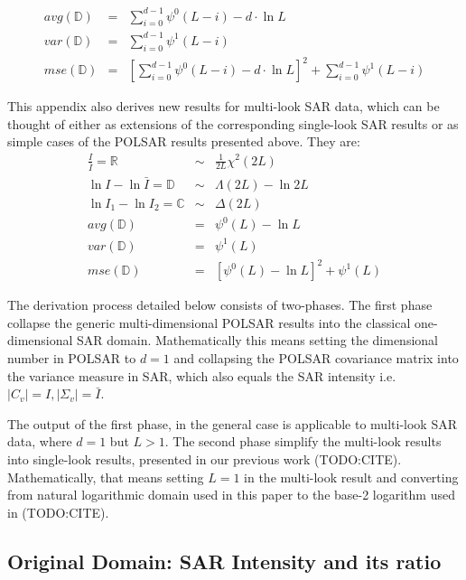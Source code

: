 \documentclass[journal]{IEEEtran}
\begin{document}
\begin{eqnarray}
  avg(\mathbb{D}) &=& \sum^{d-1}_{i=0} \psi^0(L-i) - d \cdot \ln{L} \label{eqn:polsar_dispersion_averages} \\
  var(\mathbb{D}) &=& \sum^{d-1}_{i=0} \psi^1(L-i) \label{eqn:polsar_dispersion_variance} \\
  mse(\mathbb{D}) &=& \left[ \sum^{d-1}_{i=0} \psi^0(L-i) - d \cdot \ln{L} \right]^2 +  \sum^{d-1}_{i=0} \psi^1(L-i) \label{eqn:polsar_dispersion_mse}
\end{eqnarray}

This appendix also derives new results for multi-look SAR data,
  which can be thought of 
    either as extensions of the corresponding single-look SAR results
    or as simple cases of the POLSAR results presented above.
They are:
  \begin{eqnarray}
    \frac{I}{\bar{I}} = \mathbb{R} &\sim& \frac{1}{2L} \chi^2(2L) \\
    \ln{I} - \ln{\bar{I}} = \mathbb{D} &\sim& \Lambda(2L) - \ln{2L} \\
    \ln{I_1} - \ln{I_2} = \mathbb{C} &\sim& \Delta(2L) \\
    avg(\mathbb{D}) &=& \psi^0(L) - \ln{L} \\
    var(\mathbb{D}) &=& \psi^1(L) \\
    mse(\mathbb{D}) &=& \left[ \psi^0(L) - \ln{L} \right]^2 + \psi^1(L)
  \end{eqnarray}

The derivation process detailed below consists of two-phases.
The first phase collapse the generic multi-dimensional POLSAR results into the classical one-dimensional SAR domain.
Mathematically this means setting the dimensional number in POLSAR to  $d=1$
  and collapsing the POLSAR covariance matrix into the variance measure in SAR, which also equals the SAR intensity i.e. $|C_v|=I,|\Sigma_v|=\bar{I}$.

The output of the first phase, in the general case is applicable to multi-look SAR data, where $d=1$ but $L>1$.
The second phase simplify the multi-look results into single-look results, presented in our previous work (TODO:CITE).
Mathematically, that means setting $L=1$ in the multi-look result
  and converting from natural logarithmic domain used in this paper to the base-2 logarithm used in (TODO:CITE).

\subsection{Original Domain: SAR Intensity and its ratio}
\end{document}
